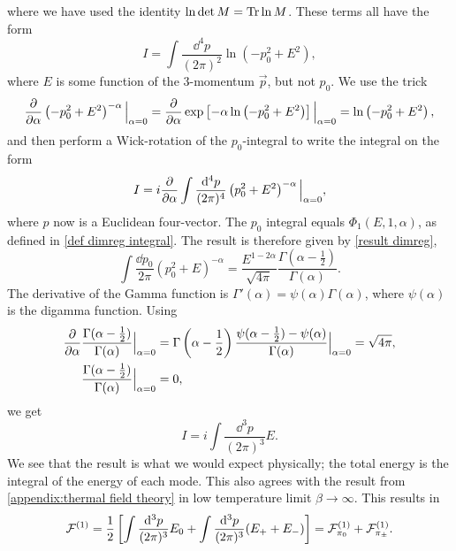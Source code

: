 where we have used the identity $\ln\det M = \Tr \ln M $.
These terms all have the form
\begin{equation}
    \label{free energy logarithmic integral}
    I = \int \frac{\dd^4 p}{(2 \pi)^2} \ln(-p_0^2 + E^2),
\end{equation}
where $E$ is some function of the 3-momentum $\vec p$, but not $p_0$.
We use the trick
\begin{equation}
    \pdv{\alpha} \left(-p_0^2 + E^2\right)^{-\alpha} \Big|_{\alpha=0}
    = \pdv{\alpha} \exp\left[ -\alpha \ln\left(- p_0^2 + E^2\right)  \right] \Big|_{\alpha=0}
    = \ln\left(- p_0^2 + E^2\right),
\end{equation}
and then perform a Wick-rotation of the $p_0$-integral to write the integral on the form 
\begin{equation}
    I = i \pdv{\alpha} \int \frac{\dd^4 p}{(2 \pi)^4} \left(p_0^2 + E^2\right)^{-\alpha} \Big|_{\alpha=0},
\end{equation}
where $p$ now is a Euclidean four-vector.
The $p_0$ integral equals $\Phi_1(E, 1, \alpha)$, as defined in \autoref{def dimreg integral}. 
The result is therefore given by \autoref{result dimreg},
\begin{equation}
    \int \frac{\dd p_0}{2 \pi} (p_0^2 + E)^{-\alpha} 
    = \frac{E^{1-2\alpha}}{\sqrt{4 \pi}} \frac{\Gamma(\alpha-\frac{1}{2})}{\Gamma(\alpha)}.
\end{equation}
The derivative of the Gamma function is $\Gamma'(\alpha) = \psi(\alpha)\Gamma(\alpha)$, where $\psi(\alpha)$ is the digamma function.
Using
\begin{align}
    \diffp{}{\alpha} & \frac{\Gamma(\alpha - \frac{1}{2}) }{\Gamma(\alpha)} \Big|_{\alpha=0}
    = \Gamma\left(\alpha - \frac{1}{2}\right) \frac{\psi(\alpha - \frac{1}{2}) - \psi(\alpha)}{\Gamma(\alpha)} \Big|_{\alpha=0}
    = \sqrt{4 \pi}, \\
    & \frac{\Gamma(\alpha - \frac{1}{2}) }{\Gamma(\alpha)}\Big|_{\alpha=0} = 0,
\end{align}
we get
\begin{equation}
    I = i \int \frac{\dd^3 p}{(2 \pi)^3} E.
\end{equation}
We see that the result is what we would expect physically; the total energy is the integral of the energy of each mode.
This also agrees with the result from \autoref{appendix:thermal field theory} in low temperature limit $\beta \rightarrow \infty$.
This results in 
\begin{equation}
    \mathcal{F}^{(1)} = 
    \frac{1}{2} 
    \left[\int \frac{\dd^3 p}{(2\pi)^3} E_0 + \int  \frac{\dd^3 p}{(2\pi)^3} (E_+ + E_-)\right]
    = \mathcal{F}^{(1)}_{\pi_0} +\mathcal{F}^{(1)}_{\pi_\pm}.
\end{equation}
